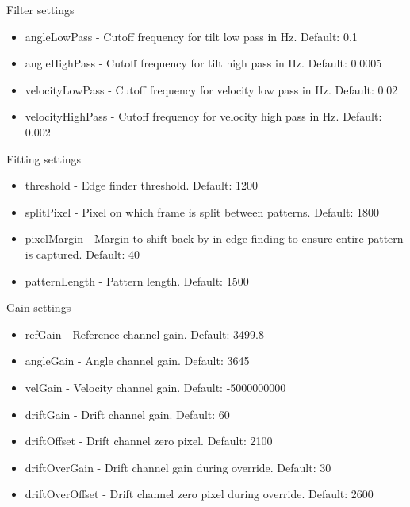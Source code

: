 \documentclass{article}
\begin{document}
Filter settings
\begin{itemize}
\item angleLowPass - Cutoff frequency for tilt low pass in Hz. Default: 0.1
\item angleHighPass - Cutoff frequency for tilt high pass in Hz. Default: 0.0005
\item velocityLowPass - Cutoff frequency for velocity low pass in Hz. Default: 0.02
\item velocityHighPass - Cutoff frequency for velocity high pass in Hz. Default: 0.002
\end{itemize}
Fitting settings
\begin{itemize}
\item threshold - Edge finder threshold. Default: 1200
\item splitPixel - Pixel on which frame is split between patterns. Default: 1800
\item pixelMargin - Margin to shift back by in edge finding to ensure entire pattern is captured. Default: 40
\item patternLength - Pattern length. Default: 1500
\end{itemize}
Gain settings
\begin{itemize}
\item refGain - Reference channel gain. Default: 3499.8
\item angleGain - Angle channel gain. Default: 3645
\item velGain - Velocity channel gain. Default: -5000000000
\item driftGain - Drift channel gain. Default: 60
\item driftOffset - Drift channel zero pixel. Default: 2100
\item driftOverGain - Drift channel gain during override. Default: 30
\item driftOverOffset - Drift channel zero pixel during override. Default: 2600
\end{itemize}
\end{document}
